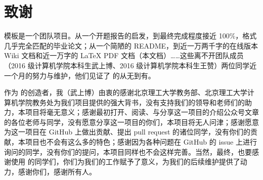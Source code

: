 \section{致谢}

{\BIThesis} 模板是一个团队项目。从一个开题报告的启发，到最终完成程度接近 100\%，格式几乎完全匹配的毕业论文；从一个简陋的 README，到近一万两千字的在线版本 Wiki 文档和近一万字的 {\LaTeX} PDF 文档（本文档）……这些离不开团队成员（2016 级计算机学院本科生武上博、2016 级计算机学院本科生王赞）两位同学近一个月的努力与维护，他们见证了 {\BIThesis} 的从无到有。

作为 {\BIThesis} 的创造者，我（武上博）由衷的感谢北京理工大学教务部、北京理工大学计算机学院教务处为我们项目提供的强大背书，没有支持我们的领导和老师们的助力，本项目将毫无意义；感谢最初打开、阅读、与分享这一项目的介绍公众号文章的各位老师与同学，没有愿意分享这一项目的你们，本项目将无人问津；感谢愿意为这一项目在 GitHub 上做出贡献、提出 pull request 的诸位同学，没有你们的贡献，本项目也不会有这么多的特色；感谢因为各种问题在 GitHub 的 issue 上进行询问的同学，没有你们的提问，本项目同样也不会这样完善。当然，最终，也要感谢使用 {\BIThesis} 的同学们，你们为我们的工作赋予了意义，为我们的后续维护提供了动力，感谢你们，感谢所有人。
